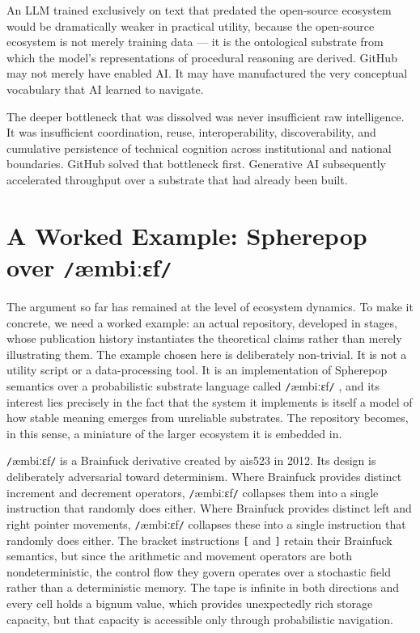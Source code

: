 \documentclass[12pt]{article}
\newcommand{\ambibf}{%
  \texttt{/}\textnormal{æmbiːɛf}\texttt{/}%
}
\begin{document}
An LLM trained exclusively on text that predated the open-source ecosystem would
be dramatically weaker in practical utility, because the open-source ecosystem is
not merely training data --- it is the ontological substrate from which the
model's representations of procedural reasoning are derived. GitHub may not
merely have enabled AI. It may have manufactured the very conceptual vocabulary
that AI learned to navigate.

The deeper bottleneck that was dissolved was never insufficient raw intelligence.
It was insufficient coordination, reuse, interoperability, discoverability, and
cumulative persistence of technical cognition across institutional and national
boundaries. GitHub solved that bottleneck first. Generative AI subsequently
accelerated throughput over a substrate that had already been built.

\section{A Worked Example: Spherepop over \ambibf{}}

The argument so far has remained at the level of ecosystem dynamics. To make
it concrete, we need a worked example: an actual repository, developed in
stages, whose publication history instantiates the theoretical claims rather
than merely illustrating them. The example chosen here is deliberately
non-trivial. It is not a utility script or a data-processing tool. It is an
implementation of Spherepop semantics over a probabilistic substrate language
called \ambibf{}, and its interest lies
precisely in the fact that the system it implements is itself a model of how
stable meaning emerges from unreliable substrates. The repository becomes, in
this sense, a miniature of the larger ecosystem it is embedded in.

\ambibf{} is a Brainfuck derivative
created by ais523 in 2012. Its design is deliberately adversarial toward
determinism. Where Brainfuck provides distinct increment and decrement operators,
\ambibf{} collapses them into a single
instruction that randomly does either. Where Brainfuck provides distinct left and
right pointer movements, \ambibf{} collapses
these into a single instruction that randomly does either. The bracket
instructions \texttt{[} and \texttt{]} retain their Brainfuck semantics, but
since the arithmetic and movement operators are both nondeterministic, the
control flow they govern operates over a stochastic field rather than a
deterministic memory. The tape is infinite in both directions and every cell
holds a bignum value, which provides unexpectedly rich storage capacity, but
that capacity is accessible only through probabilistic navigation.
\end{document}
